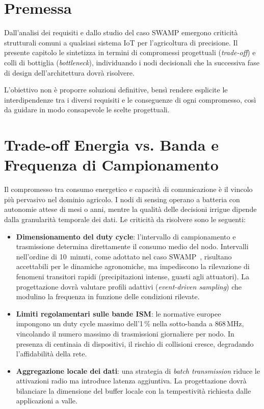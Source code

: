 
\section{Premessa}

Dall'analisi dei requisiti e dallo studio del caso SWAMP emergono criticità strutturali comuni a qualsiasi sistema IoT per l'agricoltura di precisione. Il presente capitolo le sintetizza in termini di compromessi progettuali (\textit{trade-off}) e colli di bottiglia (\textit{bottleneck}), individuando i nodi decisionali che la successiva fase di design dell'architettura dovrà risolvere.

L'obiettivo non è proporre soluzioni definitive, bensì rendere esplicite le interdipendenze tra i diversi requisiti e le conseguenze di ogni compromesso, così da guidare in modo consapevole le scelte progettuali.


\section{Trade-off Energia vs. Banda e Frequenza di Campionamento}

Il compromesso tra consumo energetico e capacità di comunicazione è il vincolo più pervasivo nel dominio agricolo. I nodi di sensing operano a batteria con autonomie attese di mesi o anni, mentre la qualità delle decisioni irrigue dipende dalla granularità temporale dei dati. Le criticità da risolvere sono le seguenti:

\begin{itemize}
	\item \textbf{Dimensionamento del duty cycle}: l'intervallo di campionamento e trasmissione determina direttamente il consumo medio del nodo. Intervalli nell'ordine di 10~minuti, come adottato nel caso SWAMP~\cite{kamienski2019swamp}, risultano accettabili per le dinamiche agronomiche, ma impediscono la rilevazione di fenomeni transitori rapidi (precipitazioni intense, guasti agli attuatori). La progettazione dovrà valutare profili adattivi (\textit{event-driven sampling}) che modulino la frequenza in funzione delle condizioni rilevate.
	
	\item \textbf{Limiti regolamentari sulle bande ISM}: le normative europee~\cite{etsi300220} impongono un duty cycle massimo dell'1\,\% nella sotto-banda a 868\,MHz, vincolando il numero massimo di trasmissioni giornaliere per nodo. In presenza di centinaia di dispositivi, il rischio di collisioni cresce, degradando l'affidabilità della rete.
	
	\item \textbf{Aggregazione locale dei dati}: una strategia di \textit{batch transmission} riduce le attivazioni radio ma introduce latenza aggiuntiva. La progettazione dovrà bilanciare la dimensione del buffer locale con la tempestività richiesta dalle applicazioni a valle.
\end{itemize}


